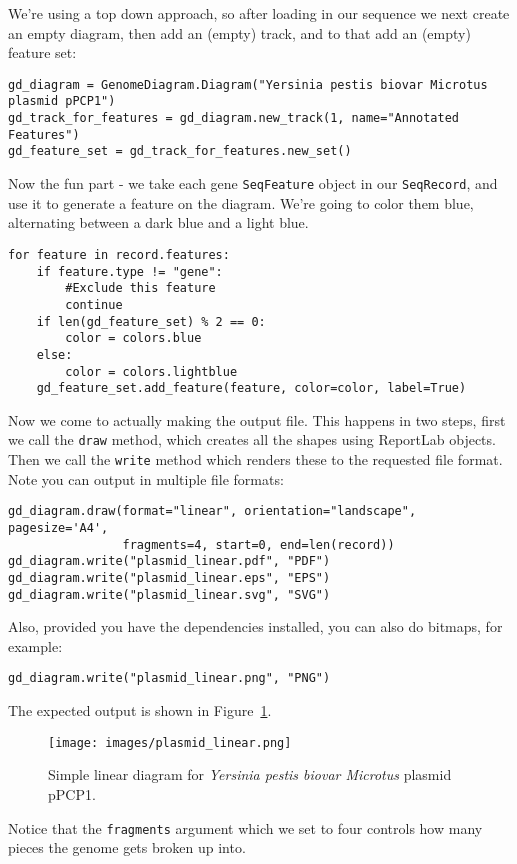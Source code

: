\documentclass{report}
\begin{document}
We're using a top down approach, so after loading in our sequence we next
create an empty diagram, then add an (empty) track, and to that add an
(empty) feature set:

\begin{verbatim}
gd_diagram = GenomeDiagram.Diagram("Yersinia pestis biovar Microtus plasmid pPCP1")
gd_track_for_features = gd_diagram.new_track(1, name="Annotated Features")
gd_feature_set = gd_track_for_features.new_set()
\end{verbatim}

Now the fun part - we take each gene \verb|SeqFeature| object in our
\verb|SeqRecord|, and use it to generate a feature on the diagram. We're
going to color them blue, alternating between a dark blue and a light blue.
\begin{verbatim}
for feature in record.features:
    if feature.type != "gene":
        #Exclude this feature
        continue
    if len(gd_feature_set) % 2 == 0:
        color = colors.blue
    else:
        color = colors.lightblue
    gd_feature_set.add_feature(feature, color=color, label=True)
\end{verbatim}

Now we come to actually making the output file.  This happens in two steps,
first we call the \verb|draw| method, which creates all the shapes using
ReportLab objects.  Then we call the \verb|write| method which renders these
to the requested file format.  Note you can output in multiple file formats:

\begin{verbatim}
gd_diagram.draw(format="linear", orientation="landscape", pagesize='A4',
                fragments=4, start=0, end=len(record))
gd_diagram.write("plasmid_linear.pdf", "PDF")
gd_diagram.write("plasmid_linear.eps", "EPS")
gd_diagram.write("plasmid_linear.svg", "SVG")
\end{verbatim}

Also, provided you have the dependencies installed, you can also do bitmaps,
for example:

\begin{verbatim}
gd_diagram.write("plasmid_linear.png", "PNG")
\end{verbatim}

\begin{htmlonly}

\end{htmlonly}
\begin{latexonly}
The expected output is shown in Figure~\ref{fig:plasmid_linear}.
\begin{figure}[htbp]
\centering
\texttt{[image: images/plasmid\_linear.png]}
\caption{Simple linear diagram for \textit{Yersinia pestis biovar Microtus} plasmid pPCP1.}
\label{fig:plasmid_linear}
\end{figure}
\end{latexonly}
Notice that the \verb|fragments| argument which we set to four controls how
many pieces the genome gets broken up into.
\end{document}
